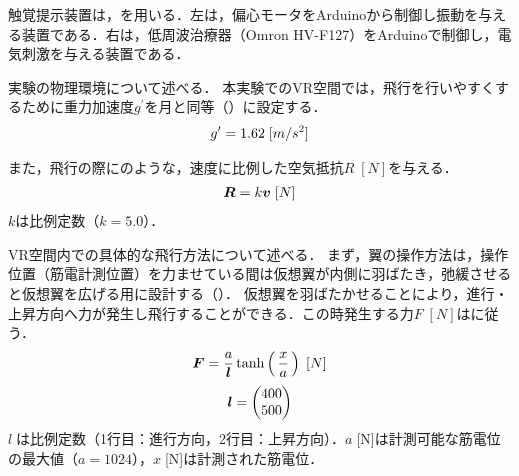 \begin{small}

        触覚提示装置は，を用いる．左は，偏心モータをArduinoから制御し振動を与える装置である．右は，低周波治療器（Omron HV-F127）をArduinoで制御し，電気刺激を与える装置である．

        実験の物理環境について述べる．
        本実験でのVR空間では，飛行を行いやすくするために重力加速度$g^{\prime}$を月と同等（）に設定する．
        \begin{eqnarray}
                \equlabel{gravity}
                g^{\prime}=1.62\;[m/s^{2}]
        \end{eqnarray}

        また，飛行の際にのような，速度に比例した空気抵抗$R\;[N]$を与える．
        \begin{eqnarray}
                \equlabel{air_resistance}
                \bm{R}=k\bm{v} \;[N]
        \end{eqnarray}
        $k$は比例定数（$k=5.0$）．


        VR空間内での具体的な飛行方法について述べる．
        まず，翼の操作方法は，操作位置（筋電計測位置）を力ませている間は仮想翼が内側に羽ばたき，弛緩させると仮想翼を広げる用に設計する（）．
        仮想翼を羽ばたかせることにより，進行・上昇方向へ力が発生し飛行することができる．この時発生する力$F\;[N]$はに従う．
        \begin{eqnarray}
                \equlabel{force}
                \bm{F}=\frac{a}{\bm{l}}  \tanh\left(\,\frac{x}{a}\,\right) \;[N]
        \end{eqnarray}
        \begin{eqnarray}
                \equlabel{force_prop}
                \bm{l}=\begin{pmatrix}400 \\ 500 \end{pmatrix}
        \end{eqnarray}
        $l\;$は比例定数（1行目：進行方向，2行目：上昇方向）．$a\;$[N]は計測可能な筋電位の最大値（$a=1024$），$x\;$[N]は計測された筋電位．


\end{small}
